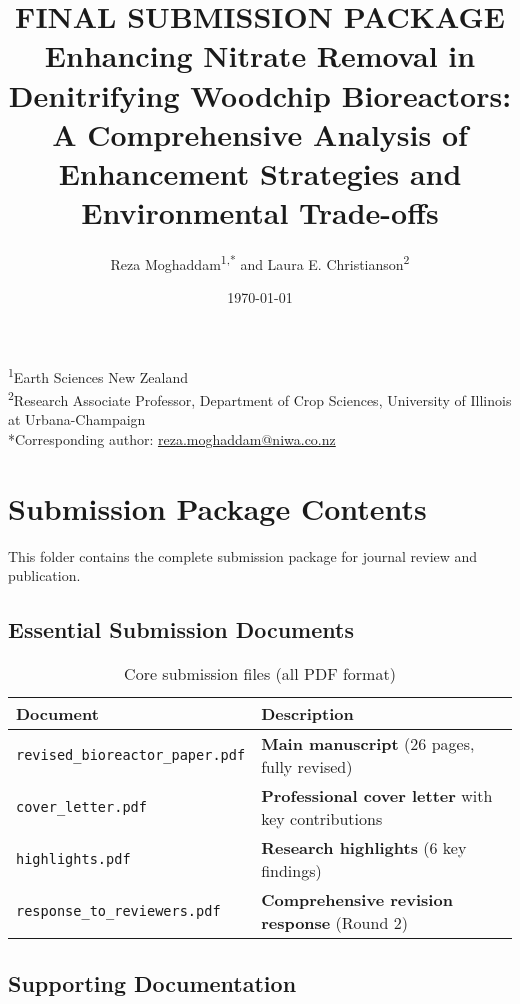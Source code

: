 \documentclass[12pt,a4paper]{article}
\title{\textbf{FINAL SUBMISSION PACKAGE}\\
\large Enhancing Nitrate Removal in Denitrifying Woodchip Bioreactors:\\
A Comprehensive Analysis of Enhancement Strategies and Environmental Trade-offs}
\author{Reza Moghaddam\textsuperscript{1,*} and Laura E. Christianson\textsuperscript{2}}
\date{\today}
\begin{document}
\maketitle

\begin{center}
\footnotesize
\textsuperscript{1}Earth Sciences New Zealand\\
\textsuperscript{2}Research Associate Professor, Department of Crop Sciences, University of Illinois at Urbana-Champaign\\
*Corresponding author: \href{mailto:reza.moghaddam@niwa.co.nz}{reza.moghaddam@niwa.co.nz}
\end{center}

\section{Submission Package Contents}

This folder contains the complete submission package for journal review and publication.

\subsection{Essential Submission Documents}

\begin{table}[h]
\centering
\begin{tabular}{>{\raggedright\arraybackslash}p{7cm} >{\raggedright\arraybackslash}p{7cm}}
\toprule
\textbf{Document} & \textbf{Description} \\
\midrule
\texttt{revised\_bioreactor\_paper.pdf} & \textbf{Main manuscript} (26 pages, fully revised) \\
\texttt{cover\_letter.pdf} & \textbf{Professional cover letter} with key contributions \\
\texttt{highlights.pdf} & \textbf{Research highlights} (6 key findings) \\
\texttt{response\_to\_reviewers.pdf} & \textbf{Comprehensive revision response} (Round 2) \\
\bottomrule
\end{tabular}
\caption{Core submission files (all PDF format)}
\end{table}

\subsection{Supporting Documentation}
\end{document}
